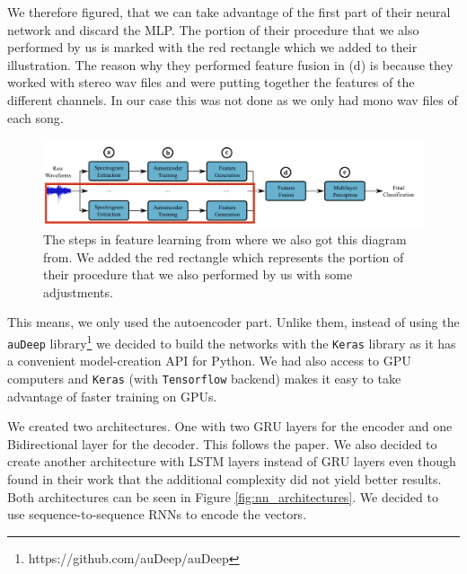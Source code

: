 We therefore figured, that we can take advantage of the first part of their neural network and discard the MLP. The portion of their procedure that we also performed by us is marked with the red rectangle which we added to their illustration. The reason why they performed feature fusion in (d) is because they worked with stereo wav files and were putting together the features of the different channels. In our case this was not done as we only had mono wav files of each song.

\begin{figure}[h]
    \centering
	\includegraphics[width=120mm]{./img/inspiration_nn.png}
	\caption{The steps in feature learning from \cite{inproceedings_RNNs} where we also got this diagram from. We added the red rectangle which represents the portion of their procedure that we also performed by us with some adjustments.}
	\label{fig:inspiration_nn}
\end{figure}

This means, we only used the autoencoder part. Unlike them, instead of using the \texttt{auDeep} library\footnote{https://github.com/auDeep/auDeep} we decided to build the networks with the \texttt{Keras} library \cite{chollet2015keras} as it has a convenient model-creation API for Python. We had also access to GPU computers and \texttt{Keras} (with \texttt{Tensorflow} backend) makes it easy to take advantage of faster training on GPUs. 

We created two architectures. One with two GRU layers for the encoder and one Bidirectional layer for the decoder. This follows the paper. We also decided to create another architecture with LSTM layers instead of GRU layers even though \cite{inproceedings_RNNs} found in their work that the additional complexity did not yield better results. Both architectures can be seen in Figure \ref{fig:nn_architectures}. We decided to use sequence-to-sequence RNNs to encode the vectors.


